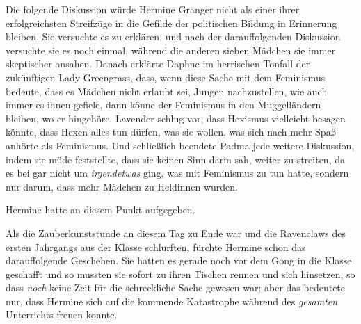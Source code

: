 Die folgende Diskussion würde Hermine Granger nicht als einer ihrer erfolgreichsten Streifzüge in die Gefilde der politischen Bildung in Erinnerung bleiben. Sie versuchte es zu erklären, und nach der darauffolgenden Diskussion versuchte sie es noch einmal, während die anderen sieben Mädchen sie immer skeptischer ansahen. Danach erklärte Daphne im herrischen Tonfall der zukünftigen Lady Greengrass, dass, wenn diese Sache mit dem Feminismus bedeute, dass es Mädchen nicht erlaubt sei, Jungen nachzustellen, wie auch immer es ihnen gefiele, dann könne der Feminismus in den Muggelländern bleiben, wo er hingehöre. Lavender schlug vor, dass Hexismus vielleicht besagen könnte, dass Hexen alles tun dürfen, was sie wollen, was sich nach mehr Spaß anhörte als Feminismus. Und schließlich beendete Padma jede weitere Diskussion, indem sie müde feststellte, dass sie keinen Sinn darin sah, weiter zu streiten, da es bei \SPHEW gar nicht um \emph{irgendetwas} ging, was mit Feminismus zu tun hatte, sondern nur darum, dass mehr Mädchen zu Heldinnen wurden.

Hermine hatte an diesem Punkt aufgegeben.

\later

Als die Zauberkunststunde an diesem Tag zu Ende war und die Ravenclaws des ersten Jahrgangs aus der Klasse schlurften, fürchte Hermine schon das darauffolgende Geschehen. Sie hatten es gerade noch vor dem Gong in die Klasse geschafft und so mussten sie sofort zu ihren Tischen rennen und sich hinsetzen, so dass \emph{noch} keine Zeit für die schreckliche Sache gewesen war; aber das bedeutete nur, dass Hermine sich auf die kommende Katastrophe während des \emph{gesamten} Unterrichts freuen konnte.

